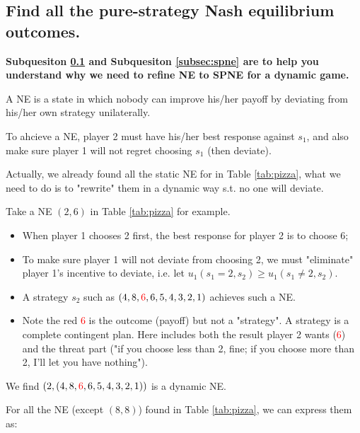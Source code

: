 \documentclass{article}
\begin{document}
%
\subsection{Find all the pure-strategy Nash equilibrium outcomes. }
\label{subsec:ne}

\begin{mdframed}[backgroundcolor=blue!20,linecolor=white]

\textbf{Subquesiton \ref{subsec:ne} and Subquesiton \ref{subsec:spne} are to help you
understand why we need to refine NE to SPNE for a dynamic game.}
\medskip

A NE is a state in which nobody can improve his/her payoff by deviating from his/her own strategy unilaterally.

\smallskip

To ahcieve a NE, player 2 must have his/her best response against $s_1$, and also make sure player 1 will not regret choosing $s_1$ (then deviate).

\medskip

Actually, we already found all the static NE for in Table \ref{tab:pizza}, what we need to do is to "rewrite" them in a dynamic way s.t. no one will deviate.

\smallskip

Take a NE $(2,6)$ in Table \ref{tab:pizza} for example.

\begin{itemize}
\item When player 1 chooses 2 first, the best response for player 2 is to choose 6;
\item To make sure player 1 will not deviate from choosing 2, we must "eliminate" player 1's incentive to deviate, i.e. let $u_1(s_1=2,s_2) \ge u_1(s_1 \ne 2,s_2)$.
\item A strategy $s_2$ such as $(4,8,\textcolor{red}{6},6,5,4,3,2,1)$ achieves such a NE. 
\item Note the red \textcolor{red}{6} is the outcome (payoff) but not a "strategy". A strategy is a complete contingent plan. Here includes both the result player 2 wants (\textcolor{red}{6}) and the threat part ("if you choose less than 2, fine; if you choose more than 2, I'll let you have nothing").
\end{itemize}

We find $(2,(4,8,\textcolor{red}{6},6,5,4,3,2,1))$ is a dynamic NE.
\medskip

For all the NE (except $(8,8)$) found in Table \ref{tab:pizza}, we can express them as:
\smallskip


\end{mdframed}
\end{document}
